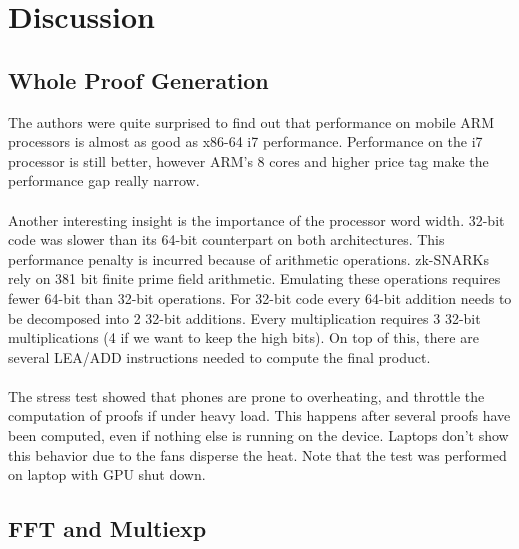 
\chapter{Discussion} %

\label{Chapter7} %


\section{Whole Proof Generation}
\label{wholeproof}

The authors were quite surprised to find out that performance on mobile ARM processors is almost as good as x86-64 i7 performance. Performance on the i7 processor is still better, however ARM's 8 cores and higher price tag make the performance gap really narrow.\\
\\
Another interesting insight is the importance of the processor word width. 32-bit code was slower than its 64-bit counterpart on both architectures. This performance penalty is incurred because of arithmetic operations. zk-SNARKs rely on 381 bit finite prime field arithmetic. Emulating these operations requires fewer 64-bit than 32-bit operations. For 32-bit code every 64-bit addition needs to be decomposed into 2 32-bit additions. Every multiplication requires 3 32-bit multiplications (4 if we want to keep the high bits). On top of this, there are several LEA/ADD instructions needed to compute the final product.\\
\\
The stress test showed that phones are prone to overheating, and throttle the computation of proofs if under heavy load. This happens after several proofs have been computed, even if nothing else is running on the device. Laptops don't show this behavior due to the fans disperse the heat. Note that the test was performed on laptop with GPU shut down.

\section{FFT and Multiexp}

